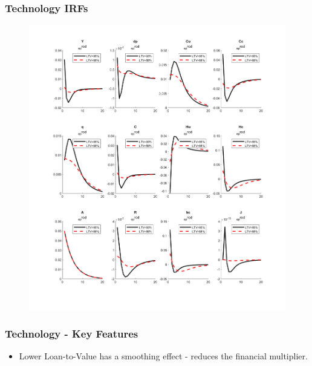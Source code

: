 \documentclass{beamer}
\begin{document}
\begin{frame}
	\frametitle{Technology IRFs}
	
	\begin{figure}[H]\centering
  \includegraphics[scale=0.3]{_e_prod}
\end{figure}
\end{frame}

\begin{frame}
	\frametitle{Technology - Key Features}
	\begin{itemize}
  \item Lower Loan-to-Value has a smoothing effect - reduces the financial multiplier.
\end{itemize}
\end{frame}
\end{document}
